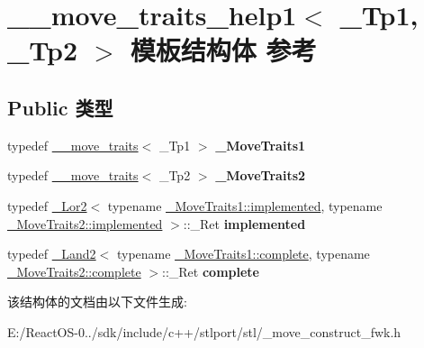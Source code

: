 \hypertarget{struct____move__traits__help1}{}\section{\+\_\+\+\_\+move\+\_\+traits\+\_\+help1$<$ \+\_\+\+Tp1, \+\_\+\+Tp2 $>$ 模板结构体 参考}
\label{struct____move__traits__help1}
\subsection*{Public 类型}
\begin{DoxyCompactItemize}
\item 
\mbox{\label{struct____move__traits__help1_a756117fa1a7ea7ebde08f7075039c891}} 
typedef \hyperlink{struct____move__traits}{\+\_\+\+\_\+move\+\_\+traits}$<$ \+\_\+\+Tp1 $>$ {\bfseries \+\_\+\+Move\+Traits1}
\item 
\mbox{\label{struct____move__traits__help1_aba86c7978db7265e867ec3dddda0f4cc}} 
typedef \hyperlink{struct____move__traits}{\+\_\+\+\_\+move\+\_\+traits}$<$ \+\_\+\+Tp2 $>$ {\bfseries \+\_\+\+Move\+Traits2}
\item 
\mbox{\label{struct____move__traits__help1_aedf2a22823a010724391736ba2e706b9}} 
typedef \hyperlink{struct___lor2}{\+\_\+\+Lor2}$<$ typename \hyperlink{struct____false__type}{\+\_\+\+Move\+Traits1\+::implemented}, typename \hyperlink{struct____false__type}{\+\_\+\+Move\+Traits2\+::implemented} $>$\+::\+\_\+\+Ret {\bfseries implemented}
\item 
\mbox{\label{struct____move__traits__help1_adc7e63d6a0ea9c87c5a4c21b4d9f85fc}} 
typedef \hyperlink{struct___land2}{\+\_\+\+Land2}$<$ typename \hyperlink{struct____true__type}{\+\_\+\+Move\+Traits1\+::complete}, typename \hyperlink{struct____true__type}{\+\_\+\+Move\+Traits2\+::complete} $>$\+::\+\_\+\+Ret {\bfseries complete}
\end{DoxyCompactItemize}


该结构体的文档由以下文件生成\+:\begin{DoxyCompactItemize}
\item 
E\+:/\+React\+O\+S-\/0../sdk/include/c++/stlport/stl/\+\_\+move\+\_\+construct\+\_\+fwk.\+h\end{DoxyCompactItemize}
